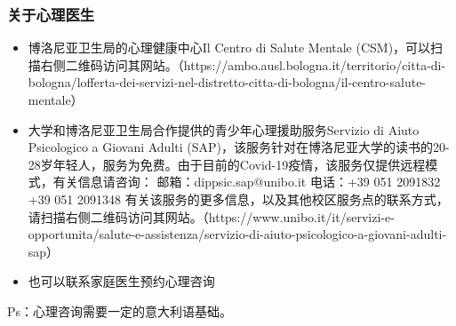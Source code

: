 \subsubsection{关于心理医生}
\begin{itemize}
\item	博洛尼亚卫生局的心理健康中心Il Centro di Salute Mentale (CSM)，可以扫描右侧二维码访问其网站。（https://ambo.ausl.bologna.it/territorio/citta-di-bologna/lofferta-dei-servizi-nel-distretto-citta-di-bologna/il-centro-salute-mentale）
\item	大学和博洛尼亚卫生局合作提供的青少年心理援助服务Servizio di Aiuto Psicologico a Giovani Adulti (SAP)，该服务针对在博洛尼亚大学的读书的20-28岁年轻人，服务为免费。由于目前的Covid-19疫情，该服务仅提供远程模式，有关信息请咨询：
邮箱：dippsic.sap@unibo.it
电话：+39 051 2091832
+39 051 2091348
有关该服务的更多信息，以及其他校区服务点的联系方式，请扫描右侧二维码访问其网站。（https://www.unibo.it/it/servizi-e-opportunita/salute-e-assistenza/servizio-di-aiuto-psicologico-a-giovani-adulti-sap）
\item	也可以联系家庭医生预约心理咨询
\end{itemize}
Ps：心理咨询需要一定的意大利语基础。


